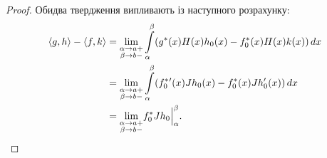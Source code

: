 \begin{proof}
	Обидва твердження випливають із наступного розрахунку:
	\begin{align*}
		\left<g,h\right> - \left<f,k\right> &= \lim_{\substack{\alpha\to a+\\ \beta\to b-}} \int\limits_\alpha^\beta (g^*(x)H(x)h_0(x) - f^*_0(x)H(x)k(x))\,dx \\
		&= \lim_{\substack{\alpha\to a+\\ \beta\to b-}} \int\limits_\alpha^\beta (f_0^{*}{'}(x)Jh_0(x) - f^*_0(x)Jh'_0(x))\,dx \\
		&= \lim_{\substack{\alpha\to a+\\ \beta\to b-}} \Bigl. f^*_0Jh_0\Bigr|_\alpha^\beta.
	\end{align*}
\end{proof}